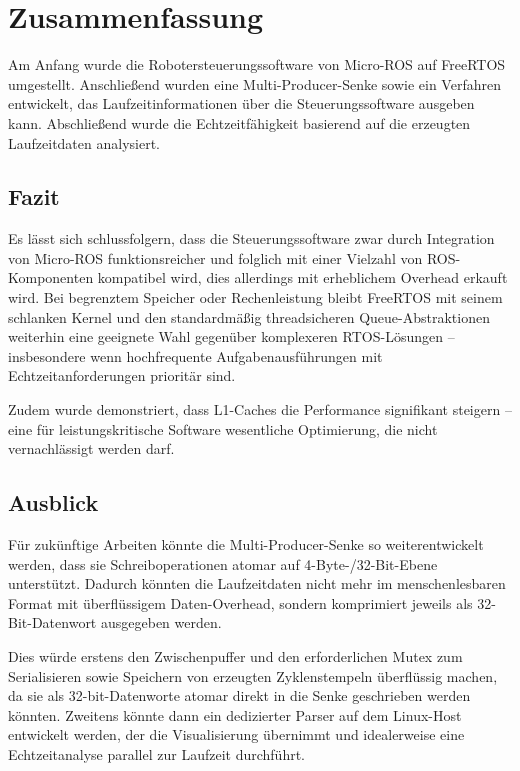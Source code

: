 \section{Zusammenfassung}

Am Anfang wurde die Robotersteuerungssoftware von Micro-ROS auf FreeRTOS
umgestellt. Anschließend wurden eine Multi-Producer-Senke sowie ein Verfahren
entwickelt, das Laufzeitinformationen über die Steuerungssoftware ausgeben kann.
Abschließend wurde die Echtzeitfähigkeit basierend auf die erzeugten
Laufzeitdaten analysiert.

\subsection{Fazit}

Es lässt sich schlussfolgern, dass die Steuerungssoftware zwar durch Integration
von Micro-ROS funktionsreicher und folglich mit einer Vielzahl von
ROS-Komponenten kompatibel wird, dies allerdings mit erheblichem Overhead
erkauft wird. Bei begrenztem Speicher oder Rechenleistung bleibt FreeRTOS mit
seinem schlanken Kernel und den standardmäßig threadsicheren Queue-Abstraktionen
weiterhin eine geeignete Wahl gegenüber komplexeren RTOS-Lösungen --
insbesondere wenn hochfrequente Aufgabenausführungen mit Echtzeitanforderungen
prioritär sind.

Zudem wurde demonstriert, dass L1-Caches die Performance signifikant steigern --
eine für leistungskritische Software wesentliche Optimierung, die nicht
vernachlässigt werden darf.

\subsection{Ausblick}

Für zukünftige Arbeiten könnte die Multi-Producer-Senke so weiterentwickelt
werden, dass sie Schreiboperationen atomar auf 4-Byte-/32-Bit-Ebene unterstützt.
Dadurch könnten die Laufzeitdaten nicht mehr im menschenlesbaren Format mit
überflüssigem Daten-Overhead, sondern komprimiert jeweils als 32-Bit-Datenwort
ausgegeben werden.

Dies würde erstens den Zwischenpuffer und den erforderlichen Mutex zum
Serialisieren sowie Speichern von erzeugten Zyklenstempeln überflüssig machen,
da sie als 32-bit-Datenworte atomar direkt in die Senke geschrieben werden
könnten. Zweitens könnte dann ein dedizierter Parser auf dem Linux-Host
entwickelt werden, der die Visualisierung übernimmt und idealerweise eine
Echtzeitanalyse parallel zur Laufzeit durchführt.

